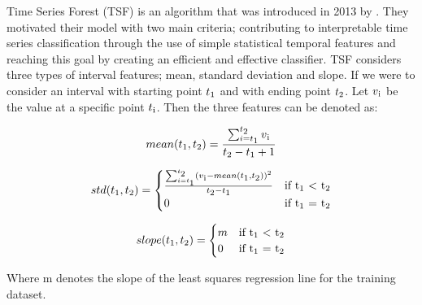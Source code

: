 Time Series Forest (TSF) is an algorithm that was introduced in 2013 by \cite{deng2013time}.
They motivated their model with two main criteria; contributing to interpretable time series classification through
the use of simple statistical temporal features and reaching this goal by creating an efficient and effective classifier.\newline
TSF considers three types of interval features; mean, standard deviation and slope.
If we were to consider an interval with starting point $t\textsubscript{1}$ and with ending point $t\textsubscript{2}$.
Let $v\textsubscript{i}$ be the value at a specific point $t\textsubscript{i}$.
Then the three features can be denoted as:
\begin{definition}
    \begin{equation}\nonumber
        mean(t\textsubscript{1},t\textsubscript{2})= \frac{\sum_{i=t\textsubscript{1}}^{t\textsubscript{2}} v\textsubscript{i}}{t\textsubscript{2} - t\textsubscript{1} + 1}
    \end{equation}
\end{definition}
\begin{definition}
    \begin{equation}\nonumber
        std(t\textsubscript{1},t\textsubscript{2})=
          \begin{cases}
            \frac{\sum_{i=t\textsubscript{1}}^{t\textsubscript{2}} (v\textsubscript{i} - mean(t\textsubscript{1},t\textsubscript{2}))^{2}}
                {t\textsubscript{2} - t\textsubscript{1}}
                & \text{if t\textsubscript{1} $<$ t\textsubscript{2}}\\
            0 & \text{if t\textsubscript{1} = t\textsubscript{2}}
          \end{cases}
      \end{equation}
\end{definition}
\begin{definition}
    \begin{equation}\nonumber
        slope(t\textsubscript{1},t\textsubscript{2})=
          \begin{cases}
            m & \text{if t\textsubscript{1} $<$ t\textsubscript{2}}\\
            0 & \text{if t\textsubscript{1} = t\textsubscript{2}}
          \end{cases}
    \end{equation}
\end{definition}
Where m denotes the slope of the least squares regression line for the training dataset.\newline
